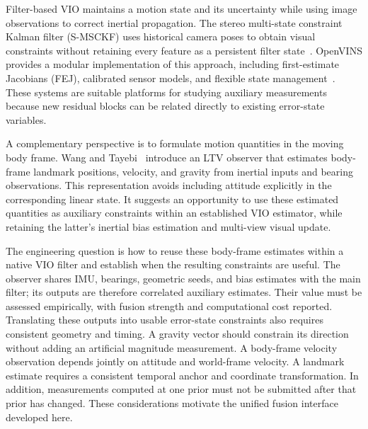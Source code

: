 \documentclass[a4paper,runningheads,twocolumn]{llncs}
\begin{document}
Filter-based VIO maintains a motion state and its uncertainty while using image observations to correct inertial propagation. The stereo multi-state constraint Kalman filter (S-MSCKF) uses historical camera poses to obtain visual constraints without retaining every feature as a persistent filter state~\cite{sun2018}. OpenVINS provides a modular implementation of this approach, including first-estimate Jacobians (FEJ), calibrated sensor models, and flexible state management~\cite{geneva2020}. These systems are suitable platforms for studying auxiliary measurements because new residual blocks can be related directly to existing error-state variables.

A complementary perspective is to formulate motion quantities in the moving body frame. Wang and Tayebi~\cite{wang2024} introduce an LTV observer that estimates body-frame landmark positions, velocity, and gravity from inertial inputs and bearing observations. This representation avoids including attitude explicitly in the corresponding linear state. It suggests an opportunity to use these estimated quantities as auxiliary constraints within an established VIO estimator, while retaining the latter's inertial bias estimation and multi-view visual update.

The engineering question is how to reuse these body-frame estimates within a native VIO filter and establish when the resulting constraints are useful. The observer shares IMU, bearings, geometric seeds, and bias estimates with the main filter; its outputs are therefore correlated auxiliary estimates. Their value must be assessed empirically, with fusion strength and computational cost reported. Translating these outputs into usable error-state constraints also requires consistent geometry and timing. A gravity vector should constrain its direction without adding an artificial magnitude measurement. A body-frame velocity observation depends jointly on attitude and world-frame velocity. A landmark estimate requires a consistent temporal anchor and coordinate transformation. In addition, measurements computed at one prior must not be submitted after that prior has changed. These considerations motivate the unified fusion interface developed here.
\end{document}
